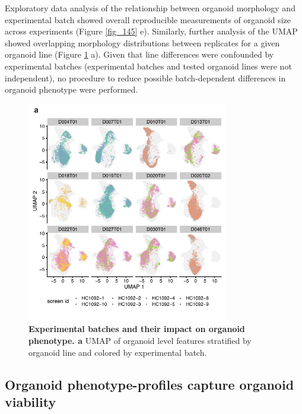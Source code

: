 \begin{flushleft}
Exploratory data analysis of the relationship between organoid morphology and experimental batch showed overall reproducible measurements of organoid size across experiments (Figure \ref{fig_145} e). Similarly, further analysis of the UMAP showed overlapping morphology distributions between replicates for a given organoid line (Figure \ref{fig_216} a). Given that line differences were confounded by experimental batches (experimental batches and tested organoid lines were not independent), no procedure to reduce possible batch-dependent differences in organoid phenotype were performed. 

\bigbreak

\begin{figure}[!h]
\centering
\includegraphics[width=250pt,
                height=\textheight,
                keepaspectratio]{figures/promise/pdf/fig_1_6.pdf}
\caption[Experimental batches and their impact on organoid phenotype]{\textbf{Experimental batches and their impact on organoid phenotype. a} UMAP of organoid level features stratified by organoid line and colored by experimental batch.}
\label{fig_216}
\end{figure}


\subsection{Organoid phenotype-profiles capture organoid viability}


\end{flushleft}
